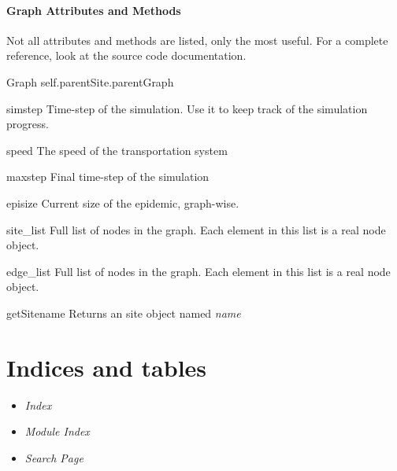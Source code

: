 \documentclass[a4paper,10pt]{manual}
\begin{document}
\subsubsection{Graph Attributes and Methods}

Not all attributes and methods are listed, only the most useful. For a complete reference, look at the source code documentation.


\hypertarget{Graph}{}\begin{classdesc}{Graph}{}
self.parentSite.parentGraph


\hypertarget{Graph.simstep}{}\begin{memberdesc}{simstep}
Time-step of the simulation. Use it to keep track of the simulation progress.
\end{memberdesc}


\hypertarget{Graph.speed}{}\begin{memberdesc}{speed}
The speed of the transportation system
\end{memberdesc}


\hypertarget{Graph.maxstep}{}\begin{memberdesc}{maxstep}
Final time-step of the simulation
\end{memberdesc}


\hypertarget{Graph.episize}{}\begin{memberdesc}{episize}
Current size of the epidemic, graph-wise.
\end{memberdesc}


\hypertarget{Graph.site_list}{}\begin{memberdesc}{site\_list}
Full list of nodes in the graph. Each element in this list is a real node object.
\end{memberdesc}


\hypertarget{Graph.edge_list}{}\begin{memberdesc}{edge\_list}
Full list of nodes in the graph. Each element in this list is a real node object.
\end{memberdesc}


\hypertarget{Graph.getSite}{}\begin{methoddesc}{getSite}{name}
Returns an site object named \emph{name}
\end{methoddesc}
\end{classdesc}


\chapter{Indices and tables}
\begin{itemize}
\item {} 
\emph{Index}

\item {} 
\emph{Module Index}

\item {} 
\emph{Search Page}

\end{itemize}
\renewcommand{\indexname}{Module Index}\printmodindex\renewcommand{\indexname}{Index}

\printindex
\end{document}
